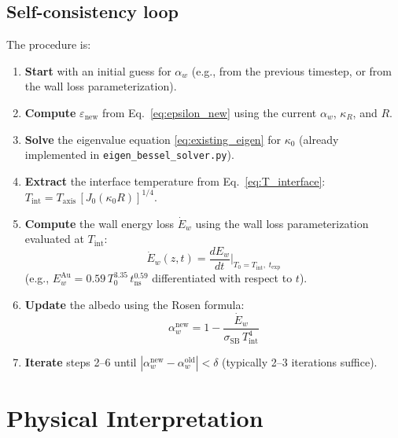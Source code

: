\documentclass[12pt]{article}
\newcommand{\sSB}{\sigma_{\mathrm{SB}}}
\newcommand{\alphaW}{\alpha_w}
\newcommand{\Ew}{\dot{E}_w}
\begin{document}
\subsection{Self-consistency loop}

The procedure is:
\begin{enumerate}
    \item \textbf{Start} with an initial guess for $\alphaW$ (e.g., from the
    previous timestep, or from the wall loss parameterization).

    \item \textbf{Compute} $\varepsilon_{\mathrm{new}}$ from
    Eq.~\eqref{eq:epsilon_new} using the current $\alphaW$, $\kappa_R$, and $R$.

    \item \textbf{Solve} the eigenvalue equation \eqref{eq:existing_eigen}
    for $\kappa_0$ (already implemented in \texttt{eigen\_bessel\_solver.py}).

    \item \textbf{Extract} the interface temperature from
    Eq.~\eqref{eq:T_interface}: $T_{\mathrm{int}} = T_{\mathrm{axis}}\,[J_0(\kappa_0 R)]^{1/4}$.

    \item \textbf{Compute} the wall energy loss $\Ew$ using the wall loss
    parameterization evaluated at $T_{\mathrm{int}}$:
    \begin{equation}
        \Ew(z,t) = \frac{dE_w}{dt}\bigg|_{T_0 = T_{\mathrm{int}},\; t_{\mathrm{exp}}}
    \end{equation}
    (e.g., $E_w^{\mathrm{Au}} = 0.59\,T_0^{3.35}\,t_{\mathrm{ns}}^{0.59}$
    differentiated with respect to $t$).

    \item \textbf{Update} the albedo using the Rosen formula:
    \begin{equation}
        \alphaW^{\mathrm{new}} = 1 - \frac{\Ew}{\sSB\,T_{\mathrm{int}}^4}
        \label{eq:albedo_update}
    \end{equation}

    \item \textbf{Iterate} steps 2--6 until $|\alphaW^{\mathrm{new}} - \alphaW^{\mathrm{old}}| < \delta$
    (typically 2--3 iterations suffice).
\end{enumerate}


\section{Physical Interpretation}
\end{document}
